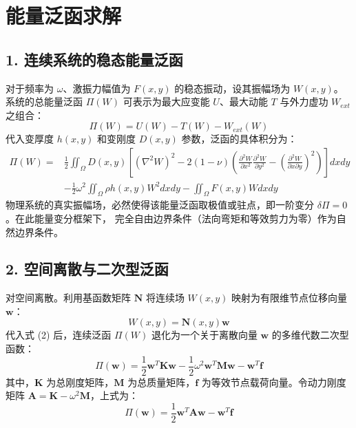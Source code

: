 \documentclass[a4paper,12pt]{ctexart}
\begin{document}
\section*{能量泛函求解}

\subsection*{1. 连续系统的稳态能量泛函}
对于频率为 $\omega$、激振力幅值为 $F(x,y)$ 的稳态振动，设其振幅场为 $W(x,y)$。系统的总能量泛函 $\Pi(W)$ 可表示为最大应变能 $U$、最大动能 $T$ 与外力虚功 $W_{ext}$ 之组合：
\begin{equation}
    \Pi(W) = U(W) - T(W) - W_{ext}(W)
\end{equation}
代入变厚度 $h(x,y)$ 和变刚度 $D(x,y)$ 参数，泛函的具体积分为：
\begin{equation}
    \begin{aligned}
        \Pi(W) =& \frac{1}{2} \iint_{\Omega} D(x,y) \left[ (\nabla^2 W)^2 - 2(1-\nu)\left( \frac{\partial^2 W}{\partial x^2}\frac{\partial^2 W}{\partial y^2} - \left(\frac{\partial^2 W}{\partial x \partial y}\right)^2 \right) \right] dxdy \\
        &- \frac{1}{2} \omega^2 \iint_{\Omega} \rho h(x,y) W^2 dxdy - \iint_{\Omega} F(x,y) W dxdy
    \end{aligned}
\end{equation}
物理系统的真实振幅场，必然使得该能量泛函取极值或驻点，即一阶变分 $\delta \Pi = 0$。在此能量变分框架下， 完全自由边界条件（法向弯矩和等效剪力为零）作为自然边界条件。

\subsection*{2. 空间离散与二次型泛函}
对空间离散。利用基函数矩阵 $\mathbf{N}$ 将连续场 $W(x,y)$ 映射为有限维节点位移向量 $\mathbf{w}$：
\begin{equation}
    W(x,y) = \mathbf{N}(x,y) \mathbf{w}
\end{equation}
代入式 (2) 后，连续泛函 $\Pi(W)$ 退化为一个关于离散向量 $\mathbf{w}$ 的多维代数二次型函数：
\begin{equation}
    \Pi(\mathbf{w}) = \frac{1}{2} \mathbf{w}^T \mathbf{K} \mathbf{w} - \frac{1}{2} \omega^2 \mathbf{w}^T \mathbf{M} \mathbf{w} - \mathbf{w}^T \mathbf{f}
\end{equation}
其中，$\mathbf{K}$ 为总刚度矩阵，$\mathbf{M}$ 为总质量矩阵，$\mathbf{f}$ 为等效节点载荷向量。令动力刚度矩阵 $\mathbf{A} = \mathbf{K} - \omega^2 \mathbf{M}$，上式为：
\begin{equation}
    \Pi(\mathbf{w}) = \frac{1}{2} \mathbf{w}^T \mathbf{A} \mathbf{w} - \mathbf{w}^T \mathbf{f}
\end{equation}
\end{document}
